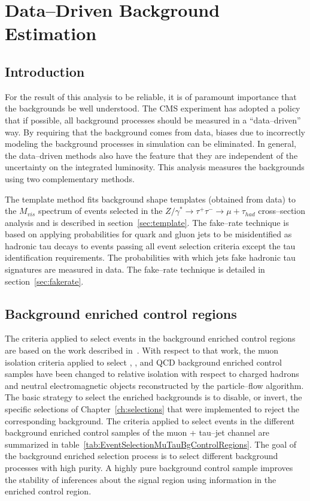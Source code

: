 \ifx\master\undefined\fi

\newcommand{\tablesize}{\small}

\chapter{Data--Driven Background Estimation}
\label{ch:backgrounds}

\section{Introduction}
%
For the result of this analysis to be reliable, it is of paramount importance
that the backgrounds be well understood.  The CMS experiment has adopted a
policy that if possible, all background processes should be measured in a
``data--driven'' way.  By requiring that the background comes from data, biases
due to incorrectly modeling the background processes in simulation can be
eliminated.  In general, the data--driven methods also have the feature that
they are independent of the uncertainty on the integrated luminosity.  This
analysis measures the backgrounds using two complementary methods.

The template method
fits background shape templates (obtained from data) to the $M_{vis}$ spectrum
of events selected in the $Z/\gamma^{*} \rightarrow \tau^{+} \tau^{-}
\rightarrow \mu + \tau_{had}$ cross--section analysis and is described in
section~\ref{sec:template}.  
The fake--rate technique is based on applying
probabilities for quark and gluon jets to be misidentified as hadronic tau
decays to events passing all event selection criteria except the tau
identification requirements.  The probabilities with which jets fake hadronic
tau signatures are measured in data.  The fake--rate technique is detailed in
section~\ref{sec:fakerate}.

\section{Background enriched control regions}
\label{sec:controlregions}
%
The criteria applied to select events in the background enriched control regions
are based on the work described in~\cite{CMS_AN_2010-088}.  With respect to that
work, the muon isolation criteria applied to select \ZMM, \WpJets, \ttbarpJets
and QCD background enriched control samples have been changed to relative
isolation with respect to charged hadrons and neutral electromagnetic objects
reconstructed by the particle--flow algorithm.   The basic strategy to select
the enriched backgrounds is to disable, or invert, the specific selections of
Chapter~\ref{ch:selections} that were implemented to reject the corresponding
background.  The criteria applied to select events in the different background
enriched control samples of the muon + tau--jet channel are summarized in
table~\ref{tab:EventSelectionMuTauBgControlRegions}.  The goal of the background
enriched selection process is to select different background processes with high
purity.  A highly pure background control sample improves the stability of
inferences about the signal region using information in the enriched control
region.

